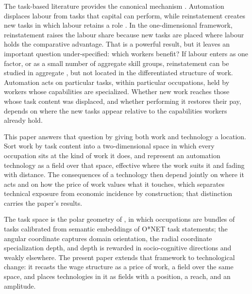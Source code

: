 \documentclass[12pt, a4paper]{article}
\begin{document}
The task-based literature provides the canonical mechanism
\parencite{acemoglu2011skills}. Automation
displaces labour from tasks that capital can perform, while
reinstatement creates new tasks in which labour retains a role
\parencite{acemoglu2018race,acemoglu2019automation}. In the
one-dimensional framework, reinstatement raises the labour share because
new tasks are placed where labour holds the comparative advantage. That
is a powerful result, but it leaves an important question under-specified:
which workers benefit? If labour enters as one factor, or as a small
number of aggregate skill groups, reinstatement can be studied in
aggregate \parencite{acemoglu2022tasks}, but not located in the
differentiated structure of work. Automation acts on particular tasks,
within particular occupations, held by workers whose capabilities are
specialized. Whether new work reaches those whose task content was
displaced, and whether performing it restores their pay, depends on where
the new tasks appear relative to the capabilities workers already hold.

This paper answers that question by giving both work and technology a
location. Sort work by task content into a two-dimensional space in which
every occupation sits at the kind of work it does, and represent an
automation technology as a field over that space, effective where the work
suits it and fading with distance. The consequences of a technology then
depend jointly on where it acts and on how the price of work values what
it touches, which separates technical exposure from economic incidence by
construction; that distinction carries the paper's results.

The task space is the polar geometry of
\textcite{storck2026geometry}, in which occupations are bundles of
tasks calibrated from semantic embeddings of O*NET task statements;
the angular coordinate captures domain orientation, the radial
coordinate specialization depth, and depth is rewarded in
socio-cognitive directions and weakly elsewhere. The present paper
extends that framework to technological change: it recasts the wage
structure as a price of work, a field over the same space, and places
technologies in it as fields with a position, a reach, and an amplitude.
\end{document}

